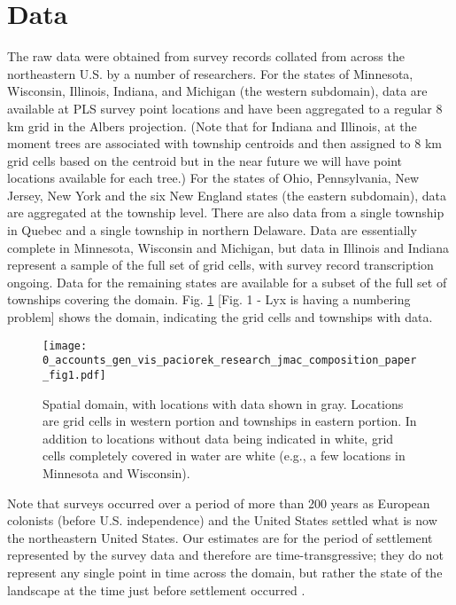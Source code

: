 \documentclass[12pt]{article}\usepackage[]{graphicx}\usepackage[]{color}
\begin{document}
\section{Data}

The raw data were obtained from survey records collated from across
the northeastern U.S. by a number of researchers. For the states of
Minnesota, Wisconsin, Illinois, Indiana, and Michigan (the western
subdomain), data are available at PLS survey point locations and have
been aggregated to a regular 8 km grid in the Albers projection. (Note
that for Indiana and Illinois, at the moment trees are associated
with township centroids and then assigned to 8 km grid cells based
on the centroid but in the near future we will have point locations
available for each tree.) For the states of Ohio, Pennsylvania, New
Jersey, New York and the six New England states (the eastern subdomain),
data are aggregated at the township level. There are also data from
a single township in Quebec and a single township in northern Delaware.
Data are essentially complete in Minnesota, Wisconsin and Michigan,
but data in Illinois and Indiana represent a sample of the full set
of grid cells, with survey record transcription ongoing. Data for
the remaining states are available for a subset of the full set of
townships covering the domain. Fig. \ref{fig:domain} {[}Fig. 1 -
Lyx is having a numbering problem{]} shows the domain, indicating
the grid cells and townships with data.

\begin{figure}
\label{fig:domain}\texttt{[image: 0\_accounts\_gen\_vis\_paciorek\_research\_jmac\_composition\_paper\_fig1.pdf]}

\caption{Spatial domain, with locations with data shown in gray. Locations
are grid cells in western portion and townships in eastern portion.
In addition to locations without data being indicated in white, grid
cells completely covered in water are white (e.g., a few locations
in Minnesota and Wisconsin).}
\end{figure}


Note that surveys occurred over a period of more than 200 years as
European colonists (before U.S. independence) and the United States
settled what is now the northeastern United States. Our estimates
are for the period of settlement represented by the survey data and
therefore are time-transgressive; they do not represent any single
point in time across the domain, but rather the state of the landscape
at the time just before settlement occurred \citep{Whit:1996,Cogb:etal:2002}.
\end{document}
